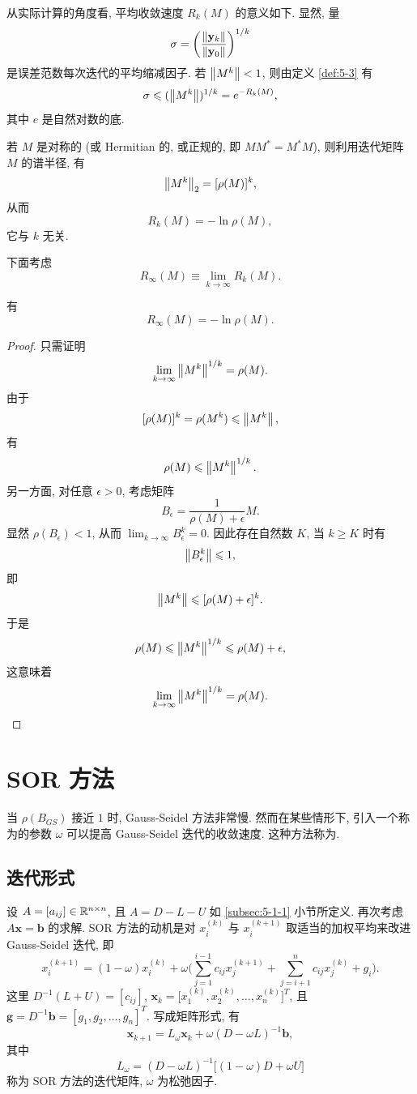 从实际计算的角度看, 平均收敛速度 $R_k(M)$ 的意义如下. 显然, 量
\[
  \sigma=\left(\frac{\left\|\mathbf{y}_k\right\|}{\left\|\mathbf{y}_0\right\|}\right)^{1/k}
\]
是误差范数每次迭代的平均缩减因子. 若 $\left\|M^k\right\|<1$, 则由定义 \ref{def:5-3} 有
\[
  \sigma\leqslant(\left\|M^k\right\|)^{1/k}=e^{-R_k(M)},
\]
其中 $e$ 是自然对数的底.

若 $M$ 是对称的 (或 Hermitian 的, 或正规的, 即 $MM^*=M^*M$), 则利用迭代矩阵 $M$ 的谱半径, 有
\[
  \left\|M^k\right\|_2=[\rho(M)]^k,
\]
从而
\[
  R_k(M)=-\ln\rho(M),
\]
它与 $k$ 无关.

下面考虑
\[
  R_\infty(M)\equiv\lim_{k\to\infty}R_k(M).
\]

\begin{theorem}
\label{thm:5-8}
有
\[
  R_\infty(M)=-\ln\rho(M).
\]
\end{theorem}

\begin{proof}
只需证明
\[
  \lim_{k\to\infty}\left\|M^k\right\|^{1/k}=\rho(M).
\]
由于
\[
  [\rho(M)]^k=\rho(M^k)\leqslant\left\|M^k\right\|,
\]
有
\[
  \rho(M)\leqslant\left\|M^k\right\|^{1/k}.
\]
另一方面, 对任意 $\epsilon>0$, 考虑矩阵
\[
  B_\epsilon=\frac{1}{\rho(M)+\epsilon}M.
\]
显然 $\rho(B_\epsilon)<1$, 从而 $\lim_{k\to\infty}B_\epsilon^k=0$. 因此存在自然数 $K$, 当 $k\geqslant K$ 时有
\[
  \left\|B_\epsilon^k\right\|\leqslant1,
\]
即
\[
  \left\|M^k\right\|\leqslant[\rho(M)+\epsilon]^k.
\]
于是
\[
  \rho(M)\leqslant\left\|M^k\right\|^{1/k}\leqslant\rho(M)+\epsilon,
\]
这意味着
\[
  \lim_{k\to\infty}\left\|M^k\right\|^{1/k}=\rho(M).\qedhere
\]
\end{proof}

\section{SOR 方法}
\label{sec:5-4}

当 $\rho(B_{GS})$ 接近 $1$ 时, Gauss-Seidel 方法非常慢. 然而在某些情形下, 引入一个称为的参数 $\omega$ 可以提高 Gauss-Seidel 迭代的收敛速度. 这种方法称为.

\subsection{迭代形式}
\label{subsec:5-4-1}

设 $A=[a_{ij}]\in\mathbb{R}^{n\times n}$, 且 $A=D-L-U$ 如 \ref{subsec:5-1-1} 小节所定义. 再次考虑 $A\mathbf{x}=\mathbf{b}$ 的求解. SOR 方法的动机是对 $x_i^{(k)}$ 与 $x_i^{(k+1)}$ 取适当的加权平均来改进 Gauss-Seidel 迭代, 即
\begin{equation}
  x_i^{(k+1)}=(1-\omega)x_i^{(k)}
  +\omega\Biggl(\sum_{j=1}^{i-1}c_{ij}x_j^{(k+1)}
  +\sum_{j=i+1}^{n}c_{ij}x_j^{(k)}+g_i\Biggr).
  \label{eq:5-8}
\end{equation}
这里 $D^{-1}(L+U)=[c_{ij}]$, $\mathbf{x}_k=\bigl[x_1^{(k)},x_2^{(k)},\ldots,x_n^{(k)}\bigr]^T$, 且 $\mathbf{g}=D^{-1}\mathbf{b}=[g_1,g_2,\ldots,g_n]^T$. 写成矩阵形式, 有
\[
  \mathbf{x}_{k+1}=L_\omega\mathbf{x}_k+\omega(D-\omega L)^{-1}\mathbf{b},
\]
其中
\[
  L_\omega=(D-\omega L)^{-1}\bigl[(1-\omega)D+\omega U\bigr]
\]
称为 SOR 方法的迭代矩阵, $\omega$ 为松弛因子.

